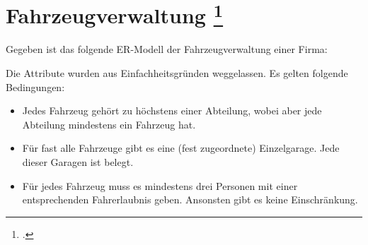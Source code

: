 \documentclass{bschlangaul-aufgabe}
\begin{document}

\section{Fahrzeugverwaltung
\footcite[Seite 2-3, Aufgabe 4: Fahrzeugverwaltung]{db:ab:1}}

Gegeben ist das folgende ER-Modell der Fahrzeugverwaltung einer Firma:


\noindent
Die Attribute wurden aus Einfachheitsgründen weggelassen. Es gelten
folgende Bedingungen:

\begin{itemize}

\item Jedes Fahrzeug gehört zu höchstens einer Abteilung, wobei aber
jede Abteilung mindestens ein Fahrzeug hat.

\item Für fast alle Fahrzeuge gibt es eine (fest zugeordnete)
Einzelgarage. Jede dieser Garagen ist belegt.

\item Für jedes Fahrzeug muss es mindestens drei Personen mit einer
entsprechenden Fahrerlaubnis geben. Ansonsten gibt es keine
Einschränkung.
\end{itemize}
\end{document}
